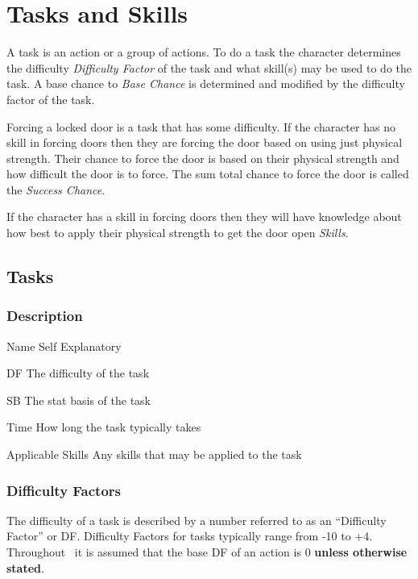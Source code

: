 \chapter{Tasks and Skills}

A task is an action or a group of actions. To do a task the 
character determines the difficulty {\em Difficulty Factor} of the 
task and what skill(s) may be used to do the task. A base chance to 
{\em Base Chance} is determined and modified by the difficulty factor 
of the task. 

Forcing a locked door is a task that has some difficulty. If the 
character has no skill in forcing doors then they are forcing the 
door based on using just physical strength. Their chance to force the 
door is based on their physical strength and how difficult the door 
is to force. The sum total chance to force the door is called the 
{\em Success Chance}.

If the character has a skill in forcing doors then they will have 
knowledge about how best to apply their physical strength to get the 
door open {\em Skills}. 

\section{Tasks}

\subsection{Description}

\begin{relate}
	\item[Name] 
	Self Explanatory
	\item[DF] The difficulty of the task
	\item[SB] The stat basis of the task
	\item[Time]
    How long the task typically takes
    \item[Applicable Skills]
    Any skills that may be applied to the task
\end{relate}

\subsection{Difficulty Factors}

The difficulty of a task is described by a number 
referred to as an ``Difficulty Factor'' or DF. Difficulty Factors 
for tasks typically range from -10  to +4. Throughout \SH\ it is 
assumed that the base DF of an action is 0 {\bf unless otherwise 
stated}. 


